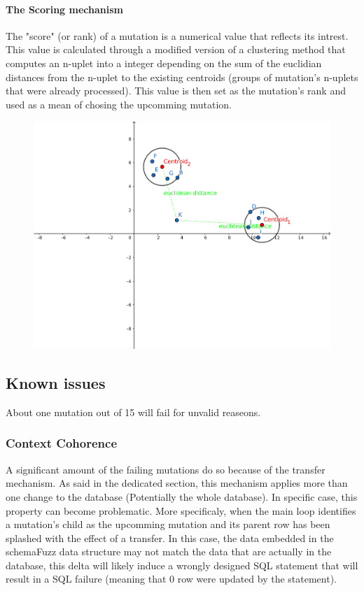 \documentclass{article}
\begin{document}
\begin{empfile}
				\paragraph{The Scoring mechanism}
The "score" (or rank) of a mutation is a numerical value that reflects its intrest. This value is calculated through a modified version of a clustering method that computes an n-uplet 			into a integer depending on the sum of the euclidian distances from the n-uplet to the existing centroids (groups of mutation's n-uplets that were already processed).
This value is then set as the mutation's rank and used as a mean of chosing the upcomming mutation.
\begin{figure} 
  \includegraphics[width=\textwidth]{Scoring.png}
\end{figure}	
		\subsection{Known issues}		
About one mutation out of 15 will fail for unvalid reaseons.
			\subsubsection{Context Cohorence}
A significant amount of the failing mutations do so because of the transfer mechanism. As said in the dedicated section, this mechanism applies more than one change to the database (Potentially the whole database). In specific case, this property can become problematic. 
More specificaly, when the main loop identifies a mutation's child as the upcomming mutation and its parent row has been splashed with the effect of a transfer. In this case, the data embedded in the schemaFuzz data structure may not match the data that are actually in the database, this delta will likely induce a wrongly designed SQL statement that will result in a SQL failure (meaning that 0 row were updated by the statement).

\end{empfile}
\end{document}
